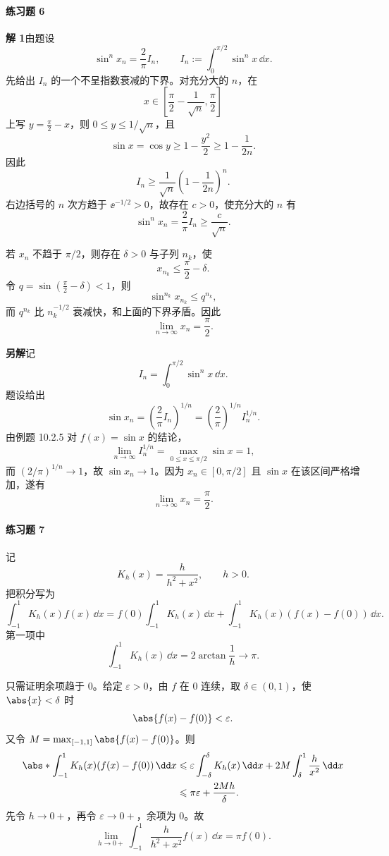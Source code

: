 \paragraph{练习题 6}
\begin{xsolution}
\textbf{解 1}\quad 由题设
\[
  \sin^n x_n=\frac2\pi I_n,
  \qquad
  I_n:=\int_0^{\pi/2}\sin^n x\,\dd x.
\]
先给出 $I_n$ 的一个不呈指数衰减的下界。对充分大的 $n$，在
\[
  x\in\left[\frac\pi2-\frac1{\sqrt n},\frac\pi2\right]
\]
上写 $y=\frac\pi2-x$，则 $0\leqslant y\leqslant1/\sqrt n$，且
\[
  \sin x=\cos y\geqslant1-\frac{y^2}{2}
  \geqslant1-\frac1{2n}.
\]
因此
\[
  I_n\geqslant\frac1{\sqrt n}
  \left(1-\frac1{2n}\right)^n.
\]
右边括号的 $n$ 次方趋于 $\ee^{-1/2}>0$，故存在 $c>0$，使充分大的 $n$ 有
\[
  \sin^n x_n=\frac2\pi I_n\geqslant\frac{c}{\sqrt n}.
\]

若 $x_n$ 不趋于 $\pi/2$，则存在 $\delta>0$ 与子列 $n_k$，使
\[
  x_{n_k}\leqslant\frac\pi2-\delta.
\]
令 $q=\sin(\frac\pi2-\delta)<1$，则
\[
  \sin^{n_k}x_{n_k}\leqslant q^{n_k},
\]
而 $q^{n_k}$ 比 $n_k^{-1/2}$ 衰减快，和上面的下界矛盾。因此
\[
  \boxed{\lim_{n\to\infty}x_n=\frac\pi2}.
\]

\textbf{另解}\quad 记
\[
  I_n=\int_0^{\pi/2}\sin^n x\,\dd x.
\]
题设给出
\[
  \sin x_n=\left(\frac2\pi I_n\right)^{1/n}
  =\left(\frac2\pi\right)^{1/n}I_n^{1/n}.
\]
由例题 10.2.5 对 $f(x)=\sin x$ 的结论，
\[
  \lim_{n\to\infty}I_n^{1/n}
  =\max_{0\leqslant x\leqslant\pi/2}\sin x=1,
\]
而 $(2/\pi)^{1/n}\to1$，故 $\sin x_n\to1$。因为 $x_n\in[0,\pi/2]$ 且 $\sin x$ 在该区间严格增加，遂有
\[
  \boxed{\lim_{n\to\infty}x_n=\frac\pi2}.
\]
\end{xsolution}

\paragraph{练习题 7}
\begin{xsolution}
记
\[
  K_h(x)=\frac{h}{h^2+x^2},\qquad h>0.
\]
把积分写为
\[
  \int_{-1}^1K_h(x)f(x)\,\dd x
  =f(0)\int_{-1}^1K_h(x)\,\dd x
  +\int_{-1}^1K_h(x)(f(x)-f(0))\,\dd x.
\]
第一项中
\[
  \int_{-1}^1K_h(x)\,\dd x
  =2\arctan\frac1h\longrightarrow\pi.
\]

只需证明余项趋于 $0$。给定 $\varepsilon>0$，由 $f$ 在 $0$ 连续，取 $\delta\in(0,1)$，使 $\abs{x}<\delta$ 时
\[
  \abs{f(x)-f(0)}<\varepsilon.
\]
又令 $M=\max_{[-1,1]}\abs{f(x)-f(0)}$。则
\begin{align*}
  \abs*{\int_{-1}^1K_h(x)(f(x)-f(0))\,\dd x}
  &\leqslant
  \varepsilon\int_{-\delta}^{\delta}K_h(x)\,\dd x
  +2M\int_\delta^1\frac{h}{x^2}\,\dd x\\
  &\leqslant \pi\varepsilon+\frac{2Mh}{\delta}.
\end{align*}
先令 $h\to0+$，再令 $\varepsilon\to0+$，余项为 $0$。故
\[
  \boxed{\lim_{h\to0+}\int_{-1}^1\frac{h}{h^2+x^2}f(x)\,\dd x=\pi f(0)}.
\]
\end{xsolution}

